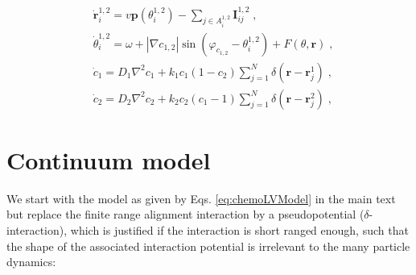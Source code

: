 \documentclass{article}
\begin{document}
\begin{subequations}
    \begin{align}
        &\dot{\mathbf{r}}_{i}^{1,2}=v\mathbf{p}\left( \theta _{i}^{1,2} \right) -\sum_{j\in A_{i}^{1,2}}{\mathbf{I}_{ij}^{1,2}\;,}\label{dotR}\\
        &\dot{\theta}_{i}^{1,2}=\omega + \left| \nabla c_{1,2} \right|\sin \left( \varphi _{c_{1,2}}-\theta _{i}^{1,2} \right) +F\left( \theta ,\mathbf{r} \right) \;,\label{dotTheta}\\
        &\dot{c}_1=D_1\nabla ^2c_1+k_1c_1\left( 1-c_2 \right) \sum_{j=1}^N{\delta \left( \mathbf{r}-\mathbf{r}_{j}^{1} \right)}\;,\\
        &\dot{c}_2=D_2\nabla ^2c_2+k_2c_2\left( c_1-1 \right) \sum_{j=1}^N{\delta \left( \mathbf{r}-\mathbf{r}_{j}^{2} \right)}\;,
    \end{align}
    \label{eq:chemoLVModel}
\end{subequations}

\section{Continuum model}
We start with the model as given by Eqs. \eqref{eq:chemoLVModel} in the main text but replace the finite range alignment interaction by a pseudopotential ($\delta$-interaction), which is justified if the interaction is short ranged enough, such that the shape of the associated interaction potential is irrelevant to the many particle dynamics:
\end{document}
